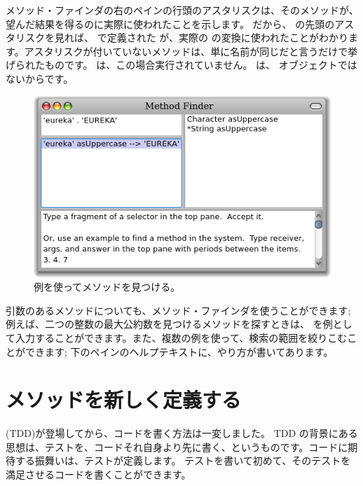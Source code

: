 \documentclass[a4paper,10pt,twoside]{book}
\begin{document}
メソッド・ファインダの右のペインの行頭のアスタリスクは、そのメソッドが、望んだ結果を得るのに実際に使われたことを示します。
だから、 の先頭のアスタリスクを見れば、 で定義された  が、実際の  の変換に使われたことがわかります。アスタリスクが付いていないメソッドは、単に名前が同じだと言うだけで挙げられたものです。 は、この場合実行されていません。 は、 オブジェクトではないからです。

\begin{figure}[hbt]
\centerline {\includegraphics[width=\textwidth]{MethodFinder-example1}}
\caption{例を使ってメソッドを見つける。
}
\end{figure}

引数のあるメソッドについても、メソッド・ファインダを使うことができます; 例えば、二つの整数の最大公約数を見つけるメソッドを探すときは、 を例として入力することができます。また、複数の例を使って、検索の範囲を絞りこむことができます; 下のペインのヘルプテキストに、やり方が書いてあります。

\section{メソッドを新しく定義する}

\cite{Beck03a} (TDD)が登場してから、コードを書く方法は一変しました。
TDD の背景にある思想は、テストを、コードそれ自身より先に書く、というものです。コードに期待する振舞いは、テストが定義します。
テストを書いて初めて、そのテストを満足させるコードを書くことができます。
\end{document}
